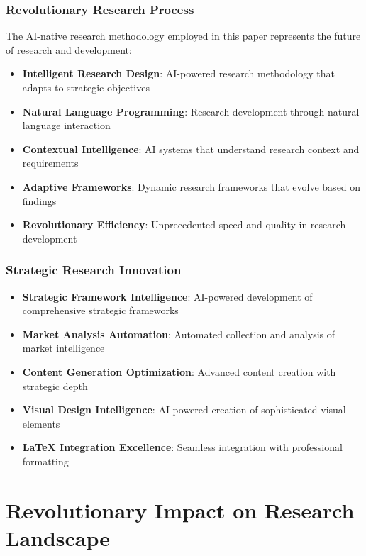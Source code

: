 \documentclass[12pt,a4paper]{book}
\begin{document}
\subsubsection{Revolutionary Research Process}

The AI-native research methodology employed in this paper represents the future of research and development:

\begin{itemize}
    \item \textbf{Intelligent Research Design}: AI-powered research methodology that adapts to strategic objectives
    \item \textbf{Natural Language Programming}: Research development through natural language interaction
    \item \textbf{Contextual Intelligence}: AI systems that understand research context and requirements
    \item \textbf{Adaptive Frameworks}: Dynamic research frameworks that evolve based on findings
    \item \textbf{Revolutionary Efficiency}: Unprecedented speed and quality in research development
\end{itemize}

\subsubsection{Strategic Research Innovation}

\begin{itemize}
    \item \textbf{Strategic Framework Intelligence}: AI-powered development of comprehensive strategic frameworks
    \item \textbf{Market Analysis Automation}: Automated collection and analysis of market intelligence
    \item \textbf{Content Generation Optimization}: Advanced content creation with strategic depth
    \item \textbf{Visual Design Intelligence}: AI-powered creation of sophisticated visual elements
    \item \textbf{LaTeX Integration Excellence}: Seamless integration with professional formatting
\end{itemize}

\section{Revolutionary Impact on Research Landscape}
\end{document}
